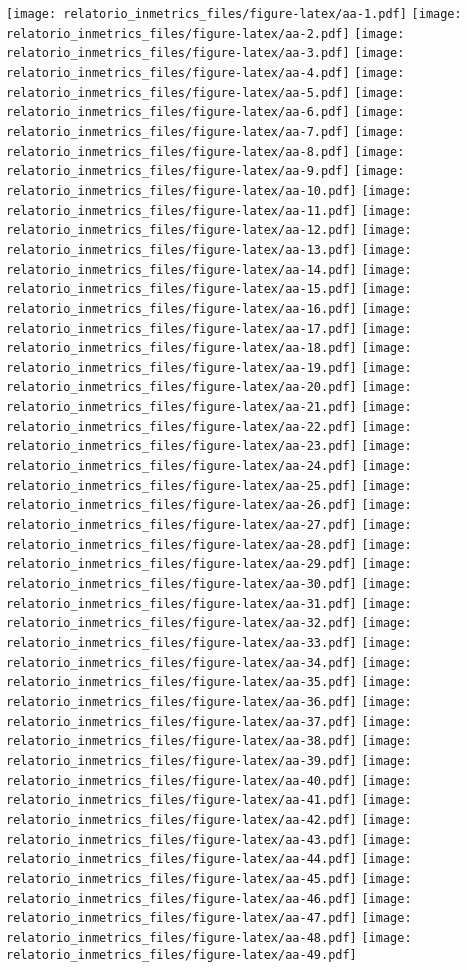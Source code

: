 \documentclass[]{book}
\begin{document}
\texttt{[image: relatorio\_inmetrics\_files/figure-latex/aa-1.pdf]} \texttt{[image: relatorio\_inmetrics\_files/figure-latex/aa-2.pdf]} \texttt{[image: relatorio\_inmetrics\_files/figure-latex/aa-3.pdf]} \texttt{[image: relatorio\_inmetrics\_files/figure-latex/aa-4.pdf]} \texttt{[image: relatorio\_inmetrics\_files/figure-latex/aa-5.pdf]} \texttt{[image: relatorio\_inmetrics\_files/figure-latex/aa-6.pdf]} \texttt{[image: relatorio\_inmetrics\_files/figure-latex/aa-7.pdf]} \texttt{[image: relatorio\_inmetrics\_files/figure-latex/aa-8.pdf]} \texttt{[image: relatorio\_inmetrics\_files/figure-latex/aa-9.pdf]} \texttt{[image: relatorio\_inmetrics\_files/figure-latex/aa-10.pdf]} \texttt{[image: relatorio\_inmetrics\_files/figure-latex/aa-11.pdf]} \texttt{[image: relatorio\_inmetrics\_files/figure-latex/aa-12.pdf]} \texttt{[image: relatorio\_inmetrics\_files/figure-latex/aa-13.pdf]} \texttt{[image: relatorio\_inmetrics\_files/figure-latex/aa-14.pdf]} \texttt{[image: relatorio\_inmetrics\_files/figure-latex/aa-15.pdf]} \texttt{[image: relatorio\_inmetrics\_files/figure-latex/aa-16.pdf]} \texttt{[image: relatorio\_inmetrics\_files/figure-latex/aa-17.pdf]} \texttt{[image: relatorio\_inmetrics\_files/figure-latex/aa-18.pdf]} \texttt{[image: relatorio\_inmetrics\_files/figure-latex/aa-19.pdf]} \texttt{[image: relatorio\_inmetrics\_files/figure-latex/aa-20.pdf]} \texttt{[image: relatorio\_inmetrics\_files/figure-latex/aa-21.pdf]} \texttt{[image: relatorio\_inmetrics\_files/figure-latex/aa-22.pdf]} \texttt{[image: relatorio\_inmetrics\_files/figure-latex/aa-23.pdf]} \texttt{[image: relatorio\_inmetrics\_files/figure-latex/aa-24.pdf]} \texttt{[image: relatorio\_inmetrics\_files/figure-latex/aa-25.pdf]} \texttt{[image: relatorio\_inmetrics\_files/figure-latex/aa-26.pdf]} \texttt{[image: relatorio\_inmetrics\_files/figure-latex/aa-27.pdf]} \texttt{[image: relatorio\_inmetrics\_files/figure-latex/aa-28.pdf]} \texttt{[image: relatorio\_inmetrics\_files/figure-latex/aa-29.pdf]} \texttt{[image: relatorio\_inmetrics\_files/figure-latex/aa-30.pdf]} \texttt{[image: relatorio\_inmetrics\_files/figure-latex/aa-31.pdf]} \texttt{[image: relatorio\_inmetrics\_files/figure-latex/aa-32.pdf]} \texttt{[image: relatorio\_inmetrics\_files/figure-latex/aa-33.pdf]} \texttt{[image: relatorio\_inmetrics\_files/figure-latex/aa-34.pdf]} \texttt{[image: relatorio\_inmetrics\_files/figure-latex/aa-35.pdf]} \texttt{[image: relatorio\_inmetrics\_files/figure-latex/aa-36.pdf]} \texttt{[image: relatorio\_inmetrics\_files/figure-latex/aa-37.pdf]} \texttt{[image: relatorio\_inmetrics\_files/figure-latex/aa-38.pdf]} \texttt{[image: relatorio\_inmetrics\_files/figure-latex/aa-39.pdf]} \texttt{[image: relatorio\_inmetrics\_files/figure-latex/aa-40.pdf]} \texttt{[image: relatorio\_inmetrics\_files/figure-latex/aa-41.pdf]} \texttt{[image: relatorio\_inmetrics\_files/figure-latex/aa-42.pdf]} \texttt{[image: relatorio\_inmetrics\_files/figure-latex/aa-43.pdf]} \texttt{[image: relatorio\_inmetrics\_files/figure-latex/aa-44.pdf]} \texttt{[image: relatorio\_inmetrics\_files/figure-latex/aa-45.pdf]} \texttt{[image: relatorio\_inmetrics\_files/figure-latex/aa-46.pdf]} \texttt{[image: relatorio\_inmetrics\_files/figure-latex/aa-47.pdf]} \texttt{[image: relatorio\_inmetrics\_files/figure-latex/aa-48.pdf]} \texttt{[image: relatorio\_inmetrics\_files/figure-latex/aa-49.pdf]} 
\end{document}
